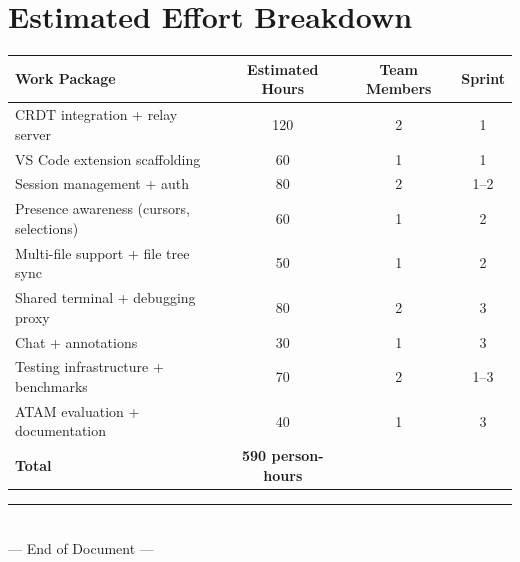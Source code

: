 \documentclass[12pt, a4paper, oneside]{article}
\begin{document}
\section{Estimated Effort Breakdown}
\begin{table}[H]
\centering
\begin{tabularx}{\textwidth}{X c c c}
\toprule
\textbf{Work Package} & \textbf{Estimated Hours} & \textbf{Team Members} & \textbf{Sprint} \\
\midrule
CRDT integration + relay server & 120 & 2 & 1 \\
VS Code extension scaffolding & 60 & 1 & 1 \\
Session management + auth & 80 & 2 & 1--2 \\
Presence awareness (cursors, selections) & 60 & 1 & 2 \\
Multi-file support + file tree sync & 50 & 1 & 2 \\
Shared terminal + debugging proxy & 80 & 2 & 3 \\
Chat + annotations & 30 & 1 & 3 \\
Testing infrastructure + benchmarks & 70 & 2 & 1--3 \\
ATAM evaluation + documentation & 40 & 1 & 3 \\
\midrule
\textbf{Total} & \textbf{590 person-hours} & & \\
\bottomrule
\end{tabularx}
\end{table}

\vfill
\begin{center}
\textcolor{gray}{\rule{0.6\textwidth}{0.5pt}}\\[6pt]
{\small\textcolor{sectioncolor}{--- End of Document ---}}
\end{center}
\end{document}
